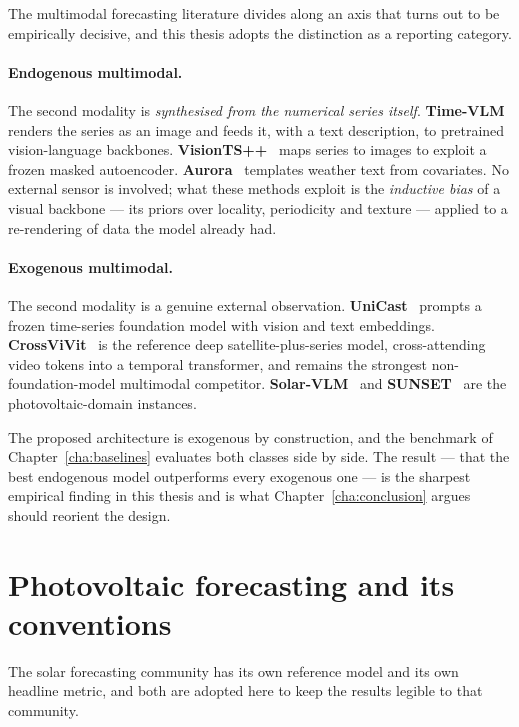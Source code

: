 The multimodal forecasting literature divides along an axis that turns out to be
empirically decisive, and this thesis adopts the distinction as a reporting category.

\paragraph{Endogenous multimodal.} The second modality is \emph{synthesised from the
numerical series itself}. \textbf{Time-VLM}~\cite{timevlm} renders the series as an image
and feeds it, with a text description, to pretrained vision-language backbones.
\textbf{VisionTS++}~\cite{visiontspp} maps series to images to exploit a frozen masked
autoencoder. \textbf{Aurora}~\cite{aurora} templates weather text from covariates. No
external sensor is involved; what these methods exploit is the \emph{inductive bias} of a
visual backbone --- its priors over locality, periodicity and texture --- applied to a
re-rendering of data the model already had.

\paragraph{Exogenous multimodal.} The second modality is a genuine external observation.
\textbf{UniCast}~\cite{unicast} prompts a frozen time-series foundation model with vision
and text embeddings. \textbf{CrossViVit}~\cite{crossvivit} is the reference deep
satellite-plus-series model, cross-attending video tokens into a temporal transformer, and
remains the strongest non-foundation-model multimodal competitor.
\textbf{Solar-VLM}~\cite{solarvlm} and \textbf{SUNSET}~\cite{sunset} are the
photovoltaic-domain instances.

The proposed architecture is exogenous by construction, and the benchmark of
Chapter~\ref{cha:baselines} evaluates both classes side by side. The result --- that the
best endogenous model outperforms every exogenous one --- is the sharpest empirical finding
in this thesis and is what Chapter~\ref{cha:conclusion} argues should reorient the design.

\section{Photovoltaic forecasting and its conventions}
\label{sec:pv-lit}

The solar forecasting community has its own reference model and its own headline metric,
and both are adopted here to keep the results legible to that community.

